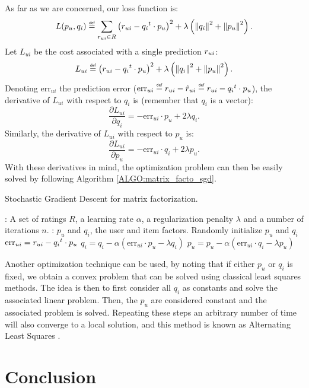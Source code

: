 As far as we are concerned, our loss function is:
$$
L(p_u, q_i) \eqdef \sum_{\rui \in R} \left(\rui - {q_i}^t \cdot p_u \right)^2 +
\lambda\left(\norm{}{q_i}^2 + \norm{}{p_u}^2\right).
$$
Let $L_{ui}$ be the cost associated with a single prediction $r_{ui}$: $$L_{ui}
\eqdef \left(\rui - {q_i}^t \cdot p_u \right)^2 + \lambda\left(\norm{}{q_i}^2 +
\norm{}{p_u}^2\right).$$
Denoting $\text{err}_{ui}$ the prediction error ($\text{err}_{ui} \eqdef \rui
-\predrui \eqdef \rui - {q_i}^t \cdot p_u$), the
derivative of $L_{ui}$ with respect to $q_i$ is (remember that $q_i$ is a
vector):
$$\frac{\partial L_{ui}}{\partial q_i} = -\text{err}_{ui} \cdot p_u + 2\lambda
q_i.$$
Similarly, the derivative of $L_{ui}$ with respect to $p_u$ is:
$$\frac{\partial L_{ui}}{\partial p_u} = -\text{err}_{ui} \cdot q_i + 2\lambda
p_u.$$
With these derivatives in mind, the optimization problem can then be easily
solved by following Algorithm \ref{ALGO:matrix_facto_sgd}.
\begin{algorithm}[!ht]
 \caption{Stochastic Gradient Descent for matrix factorization.}
       \label{ALGO:matrix_facto_sgd}
       \begin{algorithmic}

         : A set of ratings $R$, a learning rate $\alpha$, a
         regularization penalty $\lambda$ and a number of iterations $n$.
         : $p_u$ and $q_i$, the user and item factors.
         \STATE Randomly initialize $p_u$ and $q_i$
         \STATE $\text{err}_{ui} = r_{ui} - {q_i}^t \cdot p_u$
         \STATE $q_i = q_i - \alpha (\text{err}_{ui} \cdot p_u - \lambda q_i)$
         \STATE $p_u = p_u - \alpha (\text{err}_{ui} \cdot q_i - \lambda p_u)$
         \ENDFOR
         \ENDFOR
\end{algorithmic}
\end{algorithm}
Another optimization technique can be used, by noting that if either $p_u$ or
$q_i$ is fixed, we obtain a convex problem that can be solved using classical
least squares methods. The idea is then to first consider all $q_i$ as
constants and solve the associated linear problem. Then, the $p_u$ are
considered constant and the associated problem is solved. Repeating these steps
an arbitrary number of time will also converge to a local solution, and this
method is known as Alternating Least Squares \cite{BelKor07}.

\section*{Conclusion}

